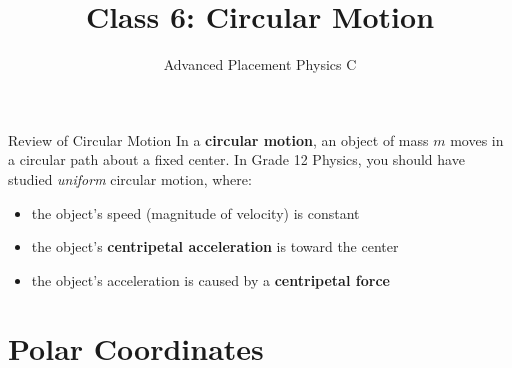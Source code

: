 \documentclass[12pt,compress,aspectratio=169]{beamer}
\title{Class 6: Circular Motion}
\subtitle{Advanced Placement Physics C}
\begin{document}
\begin{frame}
  \maketitle
\end{frame}



\begin{frame}{Review of Circular Motion}
  In a \textbf{circular motion}, an object of mass $m$ moves in a circular path
  about a fixed center. In Grade 12 Physics, you should have studied
  \emph{uniform} circular motion, where:
  \begin{itemize}
  \item the object's speed (magnitude of velocity) is constant
  \item the object's \textbf{centripetal acceleration} is toward the center
  \item the object's acceleration is caused by a \textbf{centripetal force}
  \end{itemize}
\end{frame}



\section{Polar Coordinates}
\end{document}
